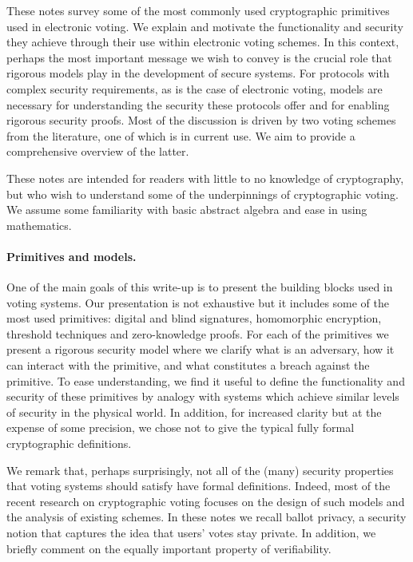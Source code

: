\documentclass[envcountsame]{llncs}
\begin{document}
These notes survey some of the most commonly used cryptographic primitives used in electronic voting.  We explain and motivate the functionality and security they achieve through their use within electronic voting schemes.  In this context, perhaps the most important message we wish to convey is the crucial role that rigorous models play in the development of secure systems.  For protocols with complex security requirements, as is the case of electronic voting, models are necessary for understanding the security these protocols offer and for enabling rigorous security proofs.
Most of the discussion is driven by two voting schemes from the literature, one of which is in current use.  We aim to provide a comprehensive overview of the latter.  


These notes are intended for readers with little to no knowledge of cryptography, but who wish to understand some of the underpinnings of cryptographic voting. We assume some familiarity with basic abstract algebra and ease in using mathematics.  


\paragraph{Primitives and models.}  One of the main goals of this write-up is to present the building blocks used in voting systems.  Our presentation is not exhaustive but it includes some of the most used primitives: digital and blind signatures, homomorphic encryption, threshold techniques and zero-knowledge proofs.   For each of the primitives we present a rigorous security model where we clarify what is an adversary, how it can interact with the primitive, and what constitutes a breach against the primitive.  To ease understanding, we find it useful to define the functionality and security of these primitives by analogy with systems which achieve similar levels of security in the physical world.  
In addition, for increased clarity but at the expense of some precision, we chose not to give the typical fully formal cryptographic definitions. 

We remark that, perhaps surprisingly, not all of the (many) security properties that voting systems should satisfy have formal definitions.  
Indeed, most of the recent research on cryptographic voting focuses on the design of such models and the analysis of existing schemes. 
In these notes we recall ballot privacy, a security notion that captures the idea that users' votes stay private.  In addition, we briefly comment on the equally important property of verifiability. 
\end{document}
